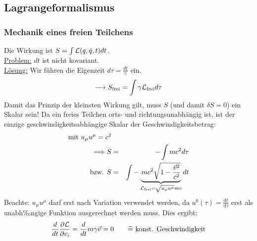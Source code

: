 \subsection{Lagrangeformalismus}
\subsubsection{Mechanik eines freien Teilchens}
Die Wirkung ist $S = \int \mathcal L(q,\dot q,t)dt$.\\
\underline{Problem:} $dt$ ist nicht kovariant.\\
\underline{Lösung:} Wir führen die Eigenzeit $d\tau = \frac{dt}{\gamma}$ ein.
\begin{eqnarray*} \longrightarrow S_{\text{frei}} =\int \gamma \mathcal L_{\text {frei}}d\tau \end{eqnarray*}
Damit das Prinzip der kleinsten Wirkung gilt, muss $S$ (und damit $\delta S = 0$) ein Skalar sein! Da ein freies Teilchen orts- und richtungsunabhängig ist, ist der einzige geschwindigkeitsabhängige Skalar der Geschwindigkeitsbetrag:
\begin{eqnarray*} \text{mit  } u_{\mu}u^{\mu} = c^2\\ \Longrightarrow S &=& - \int mc^2d\tau \\
\text{bzw. } S &=& \int - \underbrace{m c^2 \sqrt{1 - \frac{\vec v ^2}{c^2}}}_{\mathcal L_{\text{frei}}=\sqrt{u_{\mu}u^{\mu}}mc}dt\end{eqnarray*}
Beachte: $u_{\mu}u^{\mu}$ darf erst nach Variation verwendet werden, da $u^0(\tau)=\frac{\text{d}t}{\text{d}\tau}$ erst als unabh‰ngige Funktion ausgerechnet werden muss.
Dies ergibt:
\begin{eqnarray*}
\frac d{dt} \frac{\partial \mathcal L}{\partial v_i} = \frac d {dt} m \gamma \vec v = 0 \qquad \widehat = \text{ konst. Geschwindigkeit}\end{eqnarray*}
